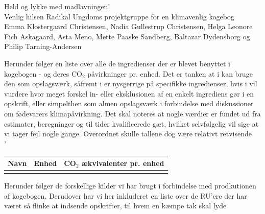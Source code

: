 \documentclass[11pt, a4paper]{article}
\newcommand{\coo}{CO$_2$ }
\begin{document}
Held og lykke med madlavningen!\\
Venlig hilsen Radikal Ungdoms projektgruppe for en klimavenlig kogebog\\
Emma Klostergaard Christensen, Nadia Gullestrup Christensen, Helga Leonore Fich Askagaard, Asta Meno, Mette Paaske Sandberg, Baltazar Dydensborg og Philip Tarning-Andersen

\newpage
\tableofcontents

\vspace{5em}
\newpage


	
\newpage


Herunder følger en liste over alle de ingredienser der er blevet benyttet i kogebogen - og deres \coo påvirkninger pr. enhed. Det er tanken at i kan bruge den som opslagsværk, såfremt i er nysgerrige på specifikke ingredienser, hvis i vil vurdere hvor meget forskel in- eller eksklusionen af en enkelt ingrediens gør i en opskrift, eller simpelthen som almen opslagsværk i forbindelse med diskussioner om fødevarers klimapåvirkning. Det skal noteres at nogle værdier er fundet ud fra estimater, beregninger og til tider kvalificerede gæt, hvilket selvfølgelig vil sige at vi tager fejl nogle gange. Overordnet skulle tallene dog være relativt retvisende\\



'
	
	\begin{longtable}{|l|l|l|}
		\hline
\textbf{Navn} & \textbf{Enhed} & \textbf{\coo ækvivalenter pr. enhed}\\ \hline
\rucooingredients		
	\end{longtable}



Herunder følger de forskellige kilder vi har brugt i forbindelse med prodkutionen af kogebogen. Derudover har vi her inkluderet en liste over de RU'ere der har været så flinke at indsende opskrifter, til hvem en kæmpe tak skal lyde
\end{document}
